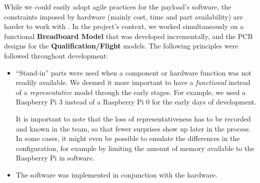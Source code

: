 \documentclass[]{iac}
\begin{document}
While we could easily adopt agile practices for the payload's software, the constraints imposed by hardware (mainly cost, time and part availability) are harder to work with \autocite{garzaniti_effectiveness_2019,peterson_when_2021}. In the project's context, we worked simultaneously on a functional \textbf{Breadboard Model} that was developed incrementally, and the PCB designs for the \textbf{Qualification/Flight} models. The following principles were followed throughout development:
\begin{itemize}
    \item ``Stand-in'' parts were used when a component or hardware function was not readily available. We deemed it more important to have a \emph{functional} instead of a \emph{representative} model through the early stages. For example, we used a Raspberry Pi 3 instead of a Raspberry Pi 0 for the early days of development.%

    It is important to note that the loss of representativeness has to be recorded and known in the team, so that fewer surprises show up later in the process. In some cases, it might even be possible to emulate the differences in the configuration, for example by limiting the amount of memory available to the Raspberry Pi in software.
    \item The software was implemented in conjunction with the hardware. 


\end{itemize}
\end{document}
